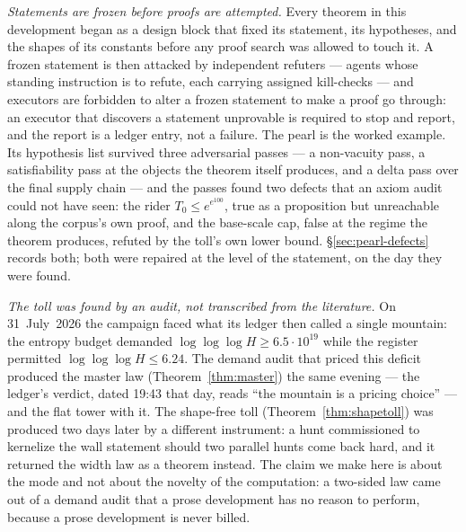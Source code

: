 \documentclass[11pt]{amsart}
\theoremstyle{remark}
\begin{document}
\emph{Statements are frozen before proofs are attempted.} Every theorem
in this development began as a design block that fixed its statement,
its hypotheses, and the shapes of its constants before any proof search
was allowed to touch it. A frozen statement is then attacked by
independent refuters --- agents whose standing instruction is to refute,
each carrying assigned kill-checks --- and executors are forbidden to
alter a frozen statement to make a proof go through: an executor that
discovers a statement unprovable is required to stop and report, and
the report is a ledger entry, not a failure. The pearl is the worked
example. Its hypothesis list survived three adversarial passes --- a
non-vacuity pass, a satisfiability pass at the objects the theorem
itself produces, and a delta pass over the final supply chain --- and
the passes found two defects that an axiom audit could not have seen:
the rider $T_0 \le e^{e^{100}}$, true as a proposition but unreachable
along the corpus's own proof, and the base-scale cap, false at the
regime the theorem produces, refuted by the toll's own lower bound.
\S\ref{sec:pearl-defects} records both; both were repaired at the level
of the statement, on the day they were found.

\emph{The toll was found by an audit, not transcribed from the
literature.} On 31~July~2026 the campaign faced what its ledger then
called a single mountain: the entropy budget demanded
$\log\log\log H \ge 6.5\cdot10^{19}$ while the register permitted
$\log\log\log H \le 6.24$. The demand audit that priced this deficit
produced the master law (Theorem~\ref{thm:master}) the same evening ---
the ledger's verdict, dated 19:43 that day, reads ``the mountain is a
pricing choice'' --- and the flat tower with it. The shape-free toll
(Theorem~\ref{thm:shapetoll}) was produced two days later by a
different instrument: a hunt commissioned to kernelize the wall
statement should two parallel hunts come back hard, and it returned the
width law as a theorem instead. The claim we make here is about the
mode and not about the novelty of the computation: a two-sided law came
out of a demand audit that a prose development has no reason to
perform, because a prose development is never billed.
\end{document}
